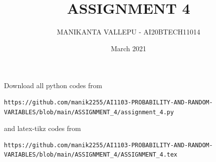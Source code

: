 \documentclass[journal,12pt,twocolumn]{IEEEtran}
\date{March 2021}
\DeclareMathOperator*{\Res}{Res}
\begin{document}
\newcommand{\BEQA}{\begin{eqnarray}}
\newcommand{\EEQA}{\end{eqnarray}}
\newcommand{\define}{\stackrel{\triangle}{=}}

\raggedbottom
\setlength{\parindent}{0pt}
\providecommand{\mbf}{\mathbf}
\providecommand{\pr}[1]{\ensuremath{\Pr\left(#1\right)}}
\providecommand{\qfunc}[1]{\ensuremath{Q\left(#1\right)}}
\providecommand{\fn}[1]{\ensuremath{f\left(#1\right)}}
\providecommand{\e}[1]{\ensuremath{E\left(#1\right)}}
\providecommand{\sbrak}[1]{\ensuremath{{}\left[#1\right]}}
\providecommand{\lsbrak}[1]{\ensuremath{{}\left[#1\right.}}
\providecommand{\rsbrak}[1]{\ensuremath{{}\left.#1\right]}}
\providecommand{\brak}[1]{\ensuremath{\left(#1\right)}}
\providecommand{\lbrak}[1]{\ensuremath{\left(#1\right.}}
\providecommand{\rbrak}[1]{\ensuremath{\left.#1\right)}}
\providecommand{\cbrak}[1]{\ensuremath{\left\{#1\right\}}}
\providecommand{\lcbrak}[1]{\ensuremath{\left\{#1\right.}}
\providecommand{\rcbrak}[1]{\ensuremath{\left.#1\right\}}}
\theoremstyle{remark}
\newtheorem{rem}{Remark}
\newcommand{\sgn}{\mathop{\mathrm{sgn}}}
\providecommand{\abs}[1]{\vert#1\vert}
\providecommand{\res}[1]{\Res\displaylimits_{#1}} 
\providecommand{\norm}[1]{\lVert#1\rVert}
\providecommand{\mtx}[1]{\mathbf{#1}}
\providecommand{\mean}[1]{E[ #1 ]}
\providecommand{\fourier}{\overset{\mathcal{F}}{ \rightleftharpoons}}
\providecommand{\system}{\overset{\mathcal{H}}{ \longleftrightarrow}}
\newcommand{\solution}{\noindent \textbf{Solution: }}
\newcommand{\cosec}{\,\text{cosec}\,}
\providecommand{\dec}[2]{\ensuremath{\overset{#1}{\underset{#2}{\gtrless}}}}
\newcommand{\myvec}[1]{\ensuremath{\begin{pmatrix}#1\end{pmatrix}}}
\newcommand{\mydet}[1]{\ensuremath{\begin{vmatrix}#1\end{vmatrix}}}
\makeatletter
\vspace{3cm}
\title{ASSIGNMENT 4}
\author{MANIKANTA VALLEPU - AI20BTECH11014}
\maketitle
\newpage
\bigskip
\renewcommand{\thetable}{\theenumi}
Download all python codes from 
\begin{lstlisting}
https://github.com/manik2255/AI1103-PROBABILITY-AND-RANDOM-VARIABLES/blob/main/ASSIGNMENT_4/assignment_4.py
\end{lstlisting}
%
and latex-tikz codes from 
%
\begin{lstlisting}
https://github.com/manik2255/AI1103-PROBABILITY-AND-RANDOM-VARIABLES/blob/main/ASSIGNMENT_4/ASSIGNMENT_4.tex
\end{lstlisting}
\end{document}
